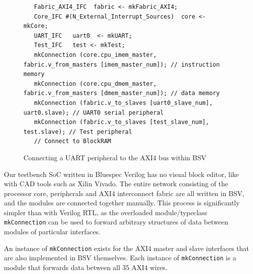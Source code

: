 \documentclass[a4paper,8pt]{report}
\begin{document}
\begin{figure}[h]
  \scriptsize
\begin{verbatim}
   Fabric_AXI4_IFC  fabric <- mkFabric_AXI4;
   Core_IFC #(N_External_Interrupt_Sources)  core <- mkCore;
   UART_IFC   uart0  <- mkUART;
   Test_IFC   test <- mkTest;
   mkConnection (core.cpu_imem_master,  fabric.v_from_masters [imem_master_num]); // instruction memory
   mkConnection (core.cpu_dmem_master,  fabric.v_from_masters [dmem_master_num]); // data memory
   mkConnection (fabric.v_to_slaves [uart0_slave_num],  uart0.slave); // UART0 serial peripheral
   mkConnection (fabric.v_to_slaves [test_slave_num],  test.slave); // Test peripheral
   // Connect to BlockRAM
\end{verbatim}
  \normalsize
  \caption{Connecting a UART peripheral to the AXI4 bus within BSV}
\end{figure}




Our testbench SoC written in Bluespec Verilog has no visual block editor, like
with CAD tools such as Xilin Vivado. The entire network consisting of the
processor core, peripherals and AXI4 interconnect fabric are all written in BSV,
and the modules are connected together manually. This process is significantly
simpler than with Verilog RTL, as the overloaded module/typeclass
\texttt{mkConnection} can be used to forward arbitrary structures of data
between modules of particular interfaces.

An instance of \texttt{mkConnection} exists for the AXI4 master and slave
interfaces that are also implemented in BSV themselves. Each instance of
\texttt{mkConnection} is a module that forwards data between all 35 AXI4 wires.
\end{document}
